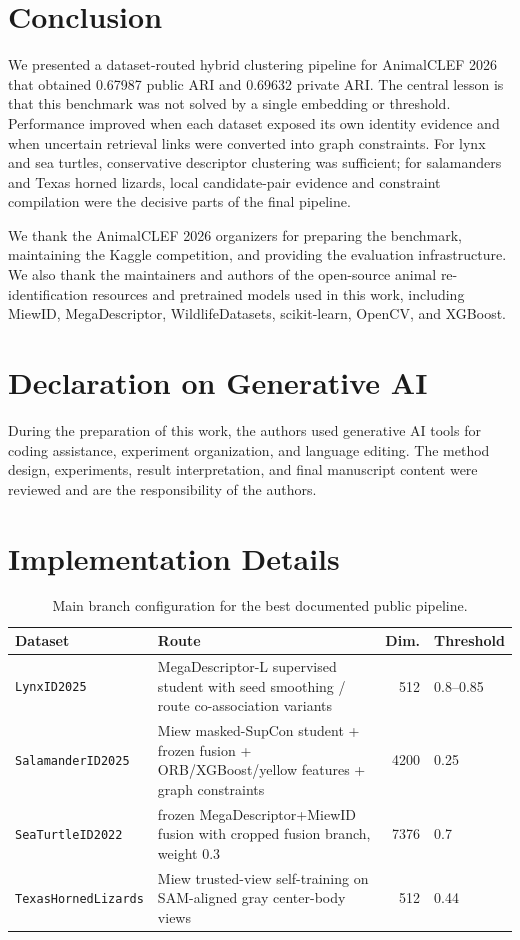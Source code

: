 \documentclass{ceurart}
\newcommand{\dataset}[1]{\texttt{#1}}
\begin{document}
\section{Conclusion}
We presented a dataset-routed hybrid clustering pipeline for AnimalCLEF 2026 that obtained 0.67987 public ARI and 0.69632 private ARI. The central lesson is that this benchmark was not solved by a single embedding or threshold. Performance improved when each dataset exposed its own identity evidence and when uncertain retrieval links were converted into graph constraints. For lynx and sea turtles, conservative descriptor clustering was sufficient; for salamanders and Texas horned lizards, local candidate-pair evidence and constraint compilation were the decisive parts of the final pipeline.

\begin{acknowledgments}
We thank the AnimalCLEF 2026 organizers for preparing the benchmark, maintaining the Kaggle competition, and providing the evaluation infrastructure. We also thank the maintainers and authors of the open-source animal re-identification resources and pretrained models used in this work, including MiewID, MegaDescriptor, WildlifeDatasets, scikit-learn, OpenCV, and XGBoost.
\end{acknowledgments}

\section*{Declaration on Generative AI}
During the preparation of this work, the authors used generative AI tools for coding assistance, experiment organization, and language editing. The method design, experiments, result interpretation, and final manuscript content were reviewed and are the responsibility of the authors.

\appendix
\section{Implementation Details}
\label{app:implementation-details}
\begin{table}[h]
  \centering
  \caption{Main branch configuration for the best documented public pipeline.}
  \label{tab:route-config}
  \small
  \begin{tabularx}{\linewidth}{lYrl}
    \toprule
    Dataset & Route & Dim. & Threshold \\
    \midrule
    \dataset{LynxID2025} & MegaDescriptor-L supervised student with seed smoothing / route co-association variants & 512 & 0.8--0.85 \\
    \dataset{SalamanderID2025} & Miew masked-SupCon student + frozen fusion + ORB/XGBoost/yellow features + graph constraints & 4200 & 0.25 \\
    \dataset{SeaTurtleID2022} & frozen MegaDescriptor+MiewID fusion with cropped fusion branch, weight 0.3 & 7376 & 0.7 \\
    \dataset{TexasHornedLizards} & Miew trusted-view self-training on SAM-aligned gray center-body views & 512 & 0.44 \\
    \bottomrule
  \end{tabularx}
\end{table}
\end{document}
